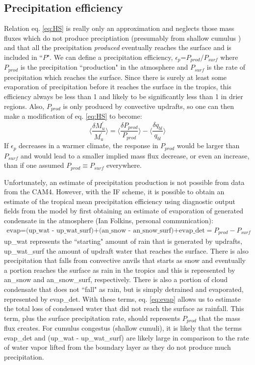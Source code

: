 \documentclass[letterpaper,12pt,titlepage,oneside,final]{book}
\begin{document}
\subsection{Precipitation efficiency}
Relation eq. \ref{eq:HS} is really only an approximation and neglects those mass fluxes which do not produce preciptiation (presumably from shallow cumulus \citep{held_robust_2006}) and that all the precipitation \textit{produced} eventually reaches the surface and is included in ``$P$". We can define a precipitation efficiency, $\epsilon_{p}$=$P_{prod}/P_{surf}$ where $P_{prod}$ is the precipitation ``production" in the atmosphere and $P_{surf}$ is the rate of precipitation which reaches the surface. Since there is surely at least some evaporation of precipitation before it reaches the surface in the tropics, this efficiency always be less than 1 and likely to be significantly less than 1 in drier regions. Also, $P_{prod}$ is only produced by convective updrafts, so one can then make a modification of eq. \ref{eq:HS} to become: 
\begin{equation}\label{eq:HS1}
\Bigg\langle\frac{\delta{M^{'}_{u}}}{M^{'}_{u}}\Bigg\rangle=\Bigg\langle\frac{\delta{P_{prod}}}{P_{prod}}\Bigg\rangle-\Bigg\langle\frac{\delta{q_{bl}}}{q_{bl}}\Bigg\rangle
\end{equation}
If $\epsilon_{p}$ decreases in a warmer climate, the response in $P_{prod}$ would be larger than $P_{surf}$ and would lead to a smaller implied mass flux decrease, or even an increase, than if one assumed $P_{prod}\equiv{P_{surf}}$ everywhere. 

Unfortunately, an estimate of precipitation production is not possible from data from the CAM4. However, with the IF scheme, it is possible to obtain an estimate of the tropical mean precipitation efficiency using diagnostic output fields from the model by first obtaining an estimate of evaporation of generated condensate in the atmosphere (Ian Folkins, personal communication):
\begin{align}\label{eq:evap}
\text{evap=(up\_wat - up\_wat\_surf)+(an\_snow - an\_snow\_surf)+evap\_det}=P_{prod}-P_{surf}
\end{align}
up\_wat represents the ``starting" amount of rain that is generated by updrafts, up\_wat\_surf the amount of updraft water that reaches the surface. There is also precipitation that falls from convective anvils that starts as snow and eventually a portion reaches the surface as rain in the tropics and this is represented by an\_snow and an\_snow\_surf, respectively. There is also a portion of cloud condensate that does not ``fall" as rain, but is simply detrained and evaporated, represented by evap\_det. With these terms, eq. \ref{eq:evap} allows us to estimate the total loss of condensed water that did not reach the surface as rainfall. This term, plus the surface precipitation rate, should represents $P_{prod}$ that the mass flux creates. For cumulus congestus (shallow cumuli), it is likely that the terms evap\_det and (up\_wat - up\_wat\_surf) are likely large in comparison to the rate of water vapor lifted from the boundary layer as they do not produce much precipitation.
\end{document}
